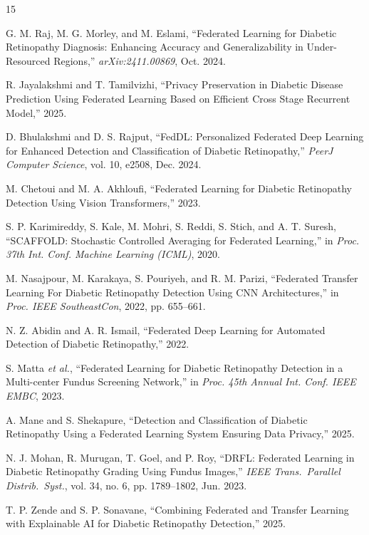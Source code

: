 \documentclass[10pt, conference]{IEEEtran}
\begin{document}
\begin{thebibliography}{15}

G. M. Raj, M. G. Morley, and M. Eslami, ``Federated Learning for Diabetic
Retinopathy Diagnosis: Enhancing Accuracy and Generalizability in
Under-Resourced Regions,'' \textit{arXiv:2411.00869}, Oct. 2024.

R. Jayalakshmi and T. Tamilvizhi, ``Privacy Preservation in Diabetic Disease
Prediction Using Federated Learning Based on Efficient Cross Stage Recurrent
Model,'' 2025.

D. Bhulakshmi and D. S. Rajput, ``FedDL: Personalized Federated Deep Learning
for Enhanced Detection and Classification of Diabetic Retinopathy,''
\textit{PeerJ Computer Science}, vol. 10, e2508, Dec. 2024.

M. Chetoui and M. A. Akhloufi, ``Federated Learning for Diabetic Retinopathy
Detection Using Vision Transformers,'' 2023.

S. P. Karimireddy, S. Kale, M. Mohri, S. Reddi, S. Stich, and A. T. Suresh,
``SCAFFOLD: Stochastic Controlled Averaging for Federated Learning,'' in
\textit{Proc. 37th Int. Conf. Machine Learning (ICML)}, 2020.

M. Nasajpour, M. Karakaya, S. Pouriyeh, and R. M. Parizi, ``Federated Transfer
Learning For Diabetic Retinopathy Detection Using CNN Architectures,'' in
\textit{Proc. IEEE SoutheastCon}, 2022, pp. 655--661.

N. Z. Abidin and A. R. Ismail, ``Federated Deep Learning for Automated
Detection of Diabetic Retinopathy,'' 2022.

S. Matta \textit{et al.}, ``Federated Learning for Diabetic Retinopathy
Detection in a Multi-center Fundus Screening Network,'' in \textit{Proc. 45th
Annual Int. Conf. IEEE EMBC}, 2023.

A. Mane and S. Shekapure, ``Detection and Classification of Diabetic
Retinopathy Using a Federated Learning System Ensuring Data Privacy,'' 2025.

N. J. Mohan, R. Murugan, T. Goel, and P. Roy, ``DRFL: Federated Learning in
Diabetic Retinopathy Grading Using Fundus Images,'' \textit{IEEE Trans.\ Parallel
Distrib.\ Syst.}, vol. 34, no. 6, pp. 1789--1802, Jun. 2023.

T. P. Zende and S. P. Sonavane, ``Combining Federated and Transfer Learning
with Explainable AI for Diabetic Retinopathy Detection,'' 2025.


\end{thebibliography}
\end{document}
